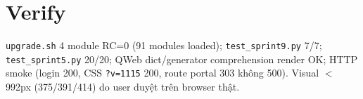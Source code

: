 \section{Verify}

\texttt{upgrade.sh} 4 module RC=0 (91 modules loaded); \texttt{test\_sprint9.py}
7/7; \texttt{test\_sprint5.py} 20/20; QWeb dict/generator comprehension render OK;
HTTP smoke (login 200, CSS \texttt{?v=1115} 200, route portal 303 không 500).
Visual \(<\)992px (375/391/414) do user duyệt trên browser thật.
